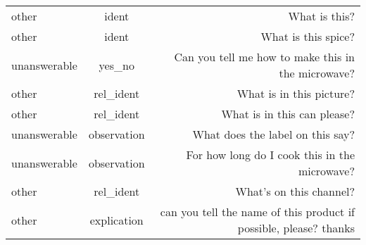 \begin{table}[!th]
{\begin{tabular}{lcr}
			other        & ident       & What is this?                                                                                                      \\
			other        & ident       & What is this spice?                                                                                                \\
			unanswerable & yes\_no     & Can you tell me how to make this in the microwave?                                                                 \\
			other        & rel\_ident  & What is in this picture?                                                                                           \\
			other        & rel\_ident  & What is in this can please?                                                                                        \\
			unanswerable & observation & What does the label on this say?                                                                                   \\
			unanswerable & observation & For how long do I cook this in the microwave?                                                                      \\
			other        & rel\_ident  & What's on this channel?                                                                                            \\
			other        & explication & can you tell the name of this product if possible, please? thanks                                                  \\
			\bottomrule
		\end{tabular}}
	\caption{}
\end{table}